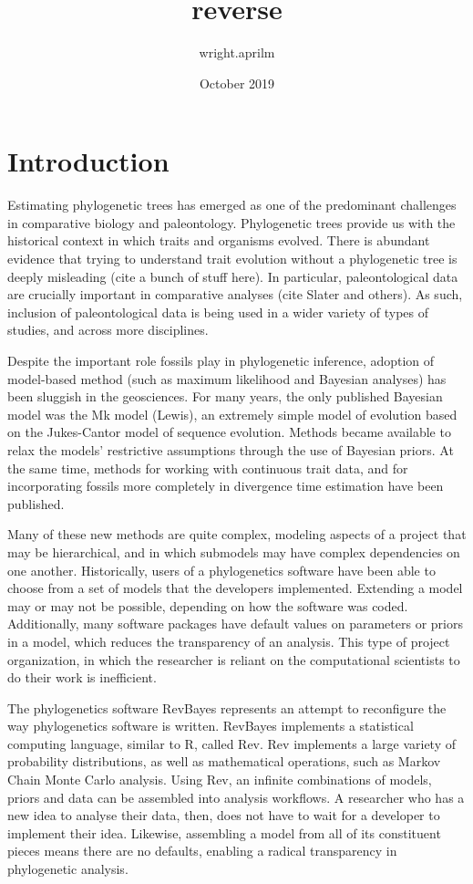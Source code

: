 \documentclass{article}
\title{reverse}
\author{wright.aprilm }
\date{October 2019}
\begin{document}
\maketitle
\section{Introduction}

Estimating phylogenetic trees has emerged as one of the predominant challenges in comparative biology and paleontology.
Phylogenetic trees provide us with the historical context in which traits and organisms evolved.
There is abundant evidence that trying to understand trait evolution without a phylogenetic tree is deeply misleading (cite a bunch of stuff here).
In particular, paleontological data are crucially important in comparative analyses (cite Slater and others).
As such, inclusion of paleontological data is being used in a wider variety of types of studies, and across more disciplines.

Despite the important role fossils play in phylogenetic inference, adoption of model-based method (such as maximum likelihood and Bayesian analyses) has been sluggish in the geosciences.
For many years, the only published Bayesian model was the Mk model (Lewis), an extremely simple model of evolution based on the Jukes-Cantor model of sequence evolution.
Methods became available to relax the models' restrictive assumptions through the use of Bayesian priors.
At the same time, methods for working with continuous trait data, and for incorporating fossils more completely in divergence time estimation have been published.

Many of these new methods are quite complex, modeling aspects of a project that may be hierarchical, and in which submodels may have complex dependencies on one another.
Historically, users of a phylogenetics software have been able to choose from a set of  models that the developers implemented.
Extending a model may or may not be possible, depending on how the software was coded. 
Additionally, many software packages have default values on parameters or priors in a model, which reduces the transparency of an analysis.
This type of project organization, in which the researcher is reliant on the computational scientists to do their work is inefficient.

The phylogenetics software RevBayes represents an attempt to reconfigure the way phylogenetics software is written.
RevBayes implements a statistical computing language, similar to R, called Rev.
Rev implements a large variety of probability distributions, as well as mathematical operations, such as Markov Chain Monte Carlo analysis.
Using Rev, an infinite combinations of models, priors and data can be assembled into analysis workflows.
A researcher who has a new idea to analyse their data, then, does not have to wait for a developer to implement their idea.
Likewise, assembling a model from all of its constituent pieces means there are no defaults, enabling a radical transparency in phylogenetic analysis. 
\end{document}
